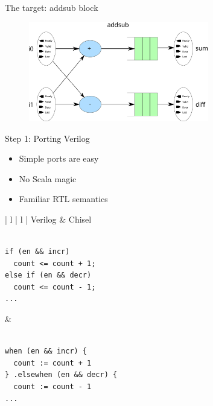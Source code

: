 \documentclass{beamer}
\newcommand{\gwidth}[0]{0.7\textwidth}
\begin{document}
\begin{frame}{The target: addsub block}
  \begin{figure}
    \centering
    \includegraphics[width=\gwidth]{figs/addsub.svg}
  \end{figure}
\end{frame}

\begin{frame}[fragile]{Step 1: Porting Verilog}
  \begin{itemize}
  \item Simple ports are easy
  \item No Scala magic
  \item Familiar RTL semantics
  \end{itemize}
  \vspace*{5mm}
  \begin{tabular}{ | l | l | }
    \hline
    Verilog & Chisel \\ \hline \small
    \begin{minipage}{0.4\textwidth}
\begin{verbatim}

if (en && incr)
  count <= count + 1;
else if (en && decr)
  count <= count - 1;
...

\end{verbatim}
    \end{minipage} &
    \begin{minipage}{0.5\textwidth}
\begin{verbatim}

when (en && incr) {
  count := count + 1
} .elsewhen (en && decr) {
  count := count - 1
...

\end{verbatim}
    \end{minipage} \\ \hline
  \end{tabular}
  \normalsize
\end{frame}
\end{document}
